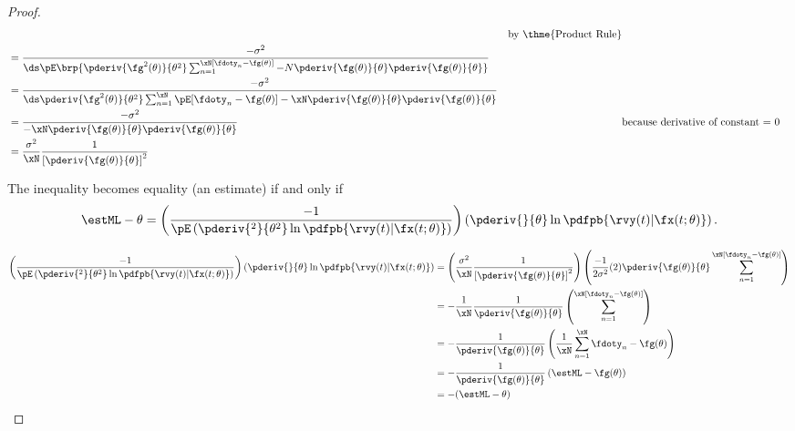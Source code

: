 \begin{proposition}
\begin{proof}
\begin{align*}
{{          }}
     && \text{by \thme{Product Rule}}
   \\&=   \frac{-\sigma^2}{\ds\pE\brp{
              \pderiv{\fg^2(\theta)}{\theta^2}
              \sum_{n=1}^\xN [\fdoty_n-\fg(\theta)]
              -N
              \pderiv{\fg(\theta)}{\theta}
              \pderiv{\fg(\theta)}{\theta}
           }}
   \\&=   \frac{-\sigma^2}{\ds
              \pderiv{\fg^2(\theta)}{\theta^2}
              \sum_{n=1}^\xN \pE[\fdoty_n-\fg(\theta)]
              -\xN
              \pderiv{\fg(\theta)}{\theta}
              \pderiv{\fg(\theta)}{\theta}
           }
   \\&=   \frac{-\sigma^2}{
              -\xN
              \pderiv{\fg(\theta)}{\theta}
              \pderiv{\fg(\theta)}{\theta}
           }
     && \text{because derivative of constant = 0}
   \\&=   \frac{\sigma^2}{\xN}
           \frac{1}{\left[ \pderiv{\fg(\theta)}{\theta} \right]^2}
\end{align*}

The inequality becomes equality (an  estimate)
if and only if
\[ \estML - \theta =
   \left( \frac{-1}{\pE\left(
              \pderiv{^2}{\theta^2} \ln \pdfpb{\rvy(t)|\fx(t;\theta)}
           \right)} \right)
   \left(\pderiv{}{\theta} \ln \pdfpb{\rvy(t)|\fx(t;\theta)} \right).
\]

\begin{align*}
   \left( \frac{-1}{\pE\left(
              \pderiv{^2}{\theta^2} \ln \pdfpb{\rvy(t)|\fx(t;\theta)}
           \right)} \right)
   \left(\pderiv{}{\theta} \ln \pdfpb{\rvy(t)|\fx(t;\theta)} \right)
     &= \left(
         \frac{\sigma^2}{\xN}
           \frac{1}{\left[ \pderiv{\fg(\theta)}{\theta} \right]^2} \right)
         \left(\frac{-1}{2\sigma^2}(2)\pderiv{\fg(\theta)}{\theta}
         \sum_{n=1}^\xN [\fdoty_n - \fg(\theta) ]\right)
   \\&= -\frac{1}{\xN}
         \frac{1}{\pderiv{\fg(\theta)}{\theta}}
         \left(\sum_{n=1}^\xN [\fdoty_n - \fg(\theta) ] \right)
   \\&= -\frac{1}{\pderiv{\fg(\theta)}{\theta}}
         \left(\frac{1}{\xN}\sum_{n=1}^\xN \fdoty_n - \fg(\theta) \right)
   \\&= -\frac{1}{\pderiv{\fg(\theta)}{\theta}}
         \left(\estML - \fg(\theta) \right)
   \\&= -(\estML - \theta)
\end{align*}
\end{proof}


\end{proposition}

